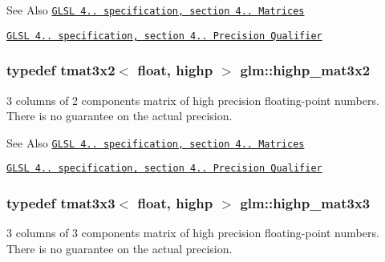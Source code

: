 \begin{DoxySeeAlso}{See Also}
\href{http://www.opengl.org/registry/doc/GLSLangSpec.4.20.8.pdf}{\tt G\-L\-S\-L 4.. specification, section 4.. Matrices} 

\href{http://www.opengl.org/registry/doc/GLSLangSpec.4.20.8.pdf}{\tt G\-L\-S\-L 4.. specification, section 4.. Precision Qualifier} 
\end{DoxySeeAlso}
\hypertarget{group__core__precision_ga5df0f5c4120d0fd47825506c86b7814c}{
\subsubsection[{highp\-\_\-mat3x2}]{\setlength{\rightskip}{0pt plus 5cm}typedef tmat3x2$<$ float, highp $>$ {\bf glm\-::highp\-\_\-mat3x2}}}\label{group__core__precision_ga5df0f5c4120d0fd47825506c86b7814c}
3 columns of 2 components matrix of high precision floating-\/point numbers. There is no guarantee on the actual precision.

\begin{DoxySeeAlso}{See Also}
\href{http://www.opengl.org/registry/doc/GLSLangSpec.4.20.8.pdf}{\tt G\-L\-S\-L 4.. specification, section 4.. Matrices} 

\href{http://www.opengl.org/registry/doc/GLSLangSpec.4.20.8.pdf}{\tt G\-L\-S\-L 4.. specification, section 4.. Precision Qualifier} 
\end{DoxySeeAlso}
\hypertarget{group__core__precision_gac4db2c4ff089b960ddd5682abaa9e5d4}{
\subsubsection[{highp\-\_\-mat3x3}]{\setlength{\rightskip}{0pt plus 5cm}typedef tmat3x3$<$ float, highp $>$ {\bf glm\-::highp\-\_\-mat3x3}}}\label{group__core__precision_gac4db2c4ff089b960ddd5682abaa9e5d4}
3 columns of 3 components matrix of high precision floating-\/point numbers. There is no guarantee on the actual precision.

